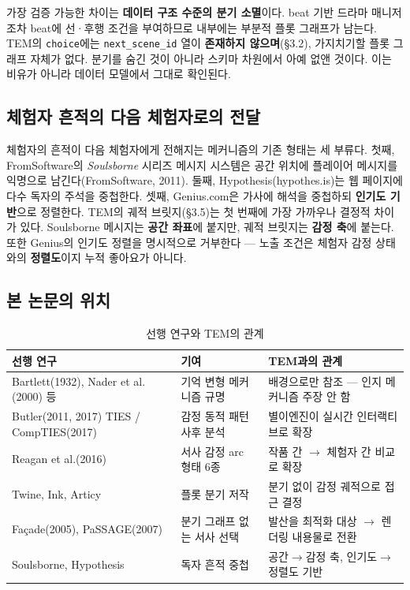 \documentclass[11pt, a4paper]{article}
\begin{document}
가장 검증 가능한 차이는 \textbf{데이터 구조 수준의 분기 소멸}이다. beat 기반 드라마 매니저조차 beat에 선·후행 조건을 부여하므로 내부에는 부분적 플롯 그래프가 남는다. TEM의 \texttt{choice}에는 \texttt{next\_scene\_id} 열이 \textbf{존재하지 않으며}(\S3.2), 가지치기할 플롯 그래프 자체가 없다. 분기를 숨긴 것이 아니라 스키마 차원에서 아예 없앤 것이다. 이는 비유가 아니라 데이터 모델에서 그대로 확인된다.

\subsection{체험자 흔적의 다음 체험자로의 전달}

체험자의 흔적이 다음 체험자에게 전해지는 메커니즘의 기존 형태는 세 부류다. 첫째, FromSoftware의 \textit{Soulsborne} 시리즈 메시지 시스템은 공간 위치에 플레이어 메시지를 익명으로 남긴다(FromSoftware, 2011). 둘째, Hypothesis(hypothes.is)는 웹 페이지에 다수 독자의 주석을 중첩한다. 셋째, Genius.com은 가사에 해석을 중첩하되 \textbf{인기도 기반}으로 정렬한다. TEM의 궤적 브릿지(\S3.5)는 첫 번째에 가장 가까우나 결정적 차이가 있다. Soulsborne 메시지는 \textbf{공간 좌표}에 붙지만, 궤적 브릿지는 \textbf{감정 축}에 붙는다. 또한 Genius의 인기도 정렬을 명시적으로 거부한다 --- 노출 조건은 체험자 감정 상태와의 \textbf{정렬도}이지 누적 좋아요가 아니다.

\subsection{본 논문의 위치}

\begin{table}[H]
\centering
\caption{선행 연구와 TEM의 관계}
\small
\begin{tabular}{p{4.6cm} p{4.0cm} p{5.2cm}}
\toprule
\textbf{선행 연구} & \textbf{기여} & \textbf{TEM과의 관계} \\
\midrule
Bartlett(1932), Nader et al.(2000) 등 & 기억 변형 메커니즘 규명 & 배경으로만 참조 --- 인지 메커니즘 주장 안 함 \\
Butler(2011, 2017) TIES / CompTIES(2017) & 감정 동적 패턴 사후 분석 & 별이엔진이 실시간 인터랙티브로 확장 \\
Reagan et al.(2016) & 서사 감정 arc 형태 6종 & 작품 간 $\rightarrow$ 체험자 간 비교로 확장 \\
Twine, Ink, Articy & 플롯 분기 저작 & 분기 없이 감정 궤적으로 접근 결정 \\
Façade(2005), PaSSAGE(2007) & 분기 그래프 없는 서사 선택 & 발산을 최적화 대상 $\rightarrow$ 렌더링 내용물로 전환 \\
Soulsborne, Hypothesis & 독자 흔적 중첩 & 공간$\rightarrow$감정 축, 인기도$\rightarrow$정렬도 기반 \\
\bottomrule
\end{tabular}
\end{table}
\end{document}
